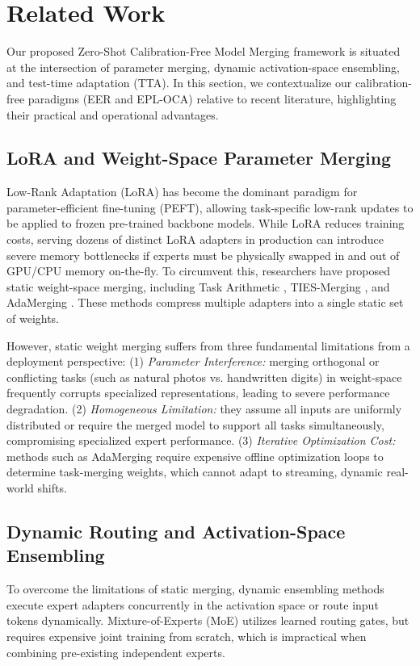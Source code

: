 \section{Related Work}
\label{sec:related_work}

Our proposed Zero-Shot Calibration-Free Model Merging framework is situated at the intersection of parameter merging, dynamic activation-space ensembling, and test-time adaptation (TTA). In this section, we contextualize our calibration-free paradigms (EER and EPL-OCA) relative to recent literature, highlighting their practical and operational advantages.

\subsection{LoRA and Weight-Space Parameter Merging}
Low-Rank Adaptation (LoRA) \cite{hu2021lora} has become the dominant paradigm for parameter-efficient fine-tuning (PEFT), allowing task-specific low-rank updates to be applied to frozen pre-trained backbone models. While LoRA reduces training costs, serving dozens of distinct LoRA adapters in production can introduce severe memory bottlenecks if experts must be physically swapped in and out of GPU/CPU memory on-the-fly. To circumvent this, researchers have proposed static weight-space merging, including Task Arithmetic \cite{ilharco2022editing}, TIES-Merging \cite{yadav2023ties}, and AdaMerging \cite{adamerging}. These methods compress multiple adapters into a single static set of weights. 

However, static weight merging suffers from three fundamental limitations from a deployment perspective: (1) \emph{Parameter Interference:} merging orthogonal or conflicting tasks (such as natural photos vs. handwritten digits) in weight-space frequently corrupts specialized representations, leading to severe performance degradation. (2) \emph{Homogeneous Limitation:} they assume all inputs are uniformly distributed or require the merged model to support all tasks simultaneously, compromising specialized expert performance. (3) \emph{Iterative Optimization Cost:} methods such as AdaMerging require expensive offline optimization loops to determine task-merging weights, which cannot adapt to streaming, dynamic real-world shifts.

\subsection{Dynamic Routing and Activation-Space Ensembling}
To overcome the limitations of static merging, dynamic ensembling methods execute expert adapters concurrently in the activation space or route input tokens dynamically. Mixture-of-Experts (MoE) \cite{shazeer2017outrageously} utilizes learned routing gates, but requires expensive joint training from scratch, which is impractical when combining pre-existing independent experts. 

